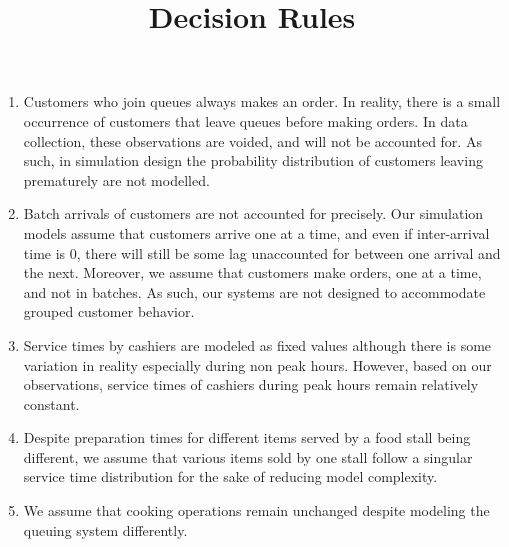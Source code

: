 \documentclass{article}
\begin{document}
\pagecolor{ultramarine}
\title{Decision Rules}
\author{}
\date{}
\maketitle
\begin{enumerate}
    \item Customers who join queues always makes an order. In reality, there is a small occurrence of customers that leave queues before making orders. In data collection, these observations are voided, and will not be accounted for. As such, in simulation design the probability distribution of customers leaving prematurely are not modelled.
    \item Batch arrivals of customers are not accounted for precisely. Our simulation models assume that customers arrive one at a time, and even if inter-arrival time is 0, there will still be some lag unaccounted for between one arrival and the next. Moreover, we assume that customers make orders, one at a time, and not in batches. As such, our systems are not designed to accommodate grouped customer behavior.
    \item Service times by cashiers are modeled as fixed values although there is some variation in reality especially during non peak hours. However, based on our observations, service times of cashiers during peak hours remain relatively constant.
    \item Despite preparation times for different items served by a food stall being different, we assume that various items sold by one stall follow a singular service time distribution for the sake of reducing model complexity.
    \item We assume that cooking operations remain unchanged despite modeling the queuing system differently.
\end{enumerate}
\end{document}
